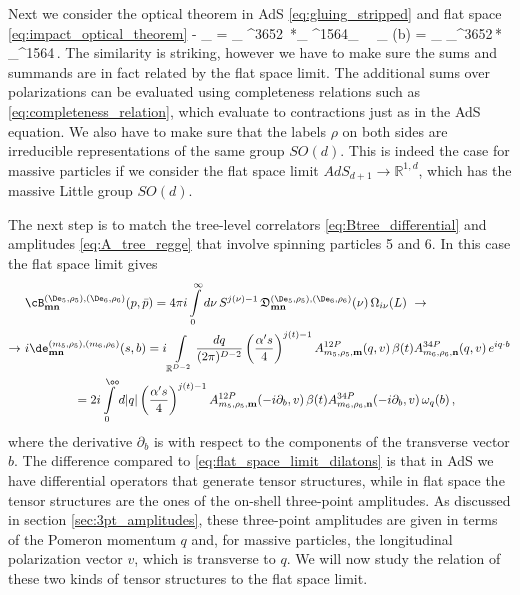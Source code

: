 Next we consider the optical theorem in AdS \eqref{eq:gluing_stripped} and flat space \eqref{eq:impact_optical_theorem}
\beq
- \Re \cB_{} = 
\sum\limits_{}
\cB^{3652\, *}_  \cB^{1564}_
\ \to \ 
		\Im \de_{} (b) 
		=  \sum\limits_{}
		\de_^{3652\,*} \de_\text{tree}^{1564}\,.
\eeq
The similarity is striking, however we have to make sure  the sums and summands are in fact related by the flat space limit.
The additional sums over polarizations can be evaluated using completeness relations such as 
\eqref{eq:completeness_relation}, which evaluate to contractions just as in the AdS equation.
We also have to make sure that the labels $\rho$ on both sides are irreducible representations of the same group $SO(d)$. This is indeed the case for massive particles if we consider the flat space limit $AdS_{d+1} \to \mathbb{R}^{1,d}$, which has the massive Little group $SO(d)$.

The next step is to match the tree-level correlators \eqref{eq:Btree_differential} and amplitudes \eqref{eq:A_tree_regge} that involve spinning particles 5 and 6. In this case the flat space limit gives
\begin{align}
&\cB^{(\De_5,\rho_5),(\De_6,\rho_6)}_{\mathbf{m} \mathbf{n}}  (p,\bar{p}) 
		= 4 \pi i \int\limits_{0}^\infty d\nu \, S^{j(\nu)-1} 
		\,\mathfrak{D}^{(\De_5,\rho_5),(\De_6,\rho_6)}_{\mathbf{m} \mathbf{n}} (\nu)
		\,\Omega_{i \nu} (L)\ \to
		\label{eq:flat_space_limit_spinning}
\\
\to\ &
i \de^{(m_5,\rho_5),(m_6,\rho_6)}_{\mathbf{m} \mathbf{n}} (s,b) 
= i \int\limits_{\mathbb{R}^{D-2}} \frac{dq}{(2\pi)^{D-2}} \left(\frac{\alpha's}{4}\right)^{j(t)-1} A^{12P}_{m_5,\rho_5,\mathbf{m}} (q,v)\, \beta(t) A^{34P}_{m_6,\rho_6,\mathbf{n}}(q,v)\, e^{i q\cdot b}
\nonumber \\
& \qquad \qquad = 2i \int\limits_0^{\oo} d|q| \left(\frac{\alpha's}{4}\right)^{j(t)-1} A^{12P}_{m_5,\rho_5,\mathbf{m}} (-i\partial_{b},v)\, \beta(t) A^{34P}_{m_6,\rho_6,\mathbf{n}}(-i\partial_{b},v)\, \omega_q(b)\,,
\nonumber
\end{align}
where the derivative $\partial_{b}$ is with respect to the components of the transverse vector $b$.
The difference compared to \eqref{eq:flat_space_limit_dilatons} is that in AdS we  have differential operators that generate tensor structures, while  in flat space the tensor structures are the ones of the on-shell three-point amplitudes. As discussed in section \ref{sec:3pt_amplitudes}, these three-point amplitudes are given in terms of the Pomeron momentum $q$ and, for massive particles, the longitudinal polarization vector $v$, which is transverse to $q$.
We will now study the relation of these two kinds of tensor structures to the flat space limit.

